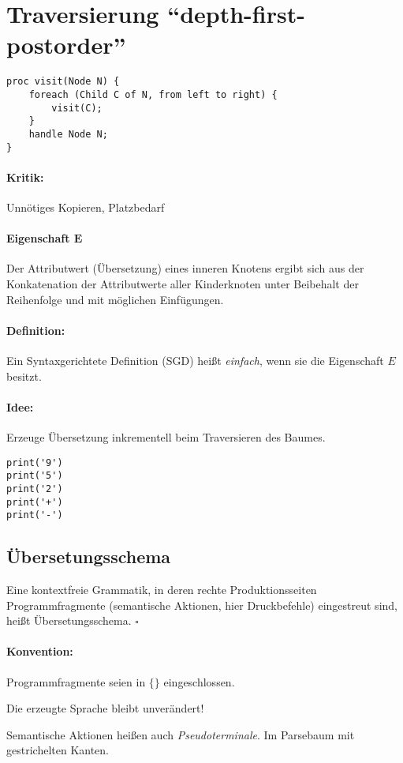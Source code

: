 \section{Traversierung "`depth-first-postorder"'}
\begin{lstlisting}
proc visit(Node N) {
	foreach (Child C of N, from left to right) {
		visit(C);
	}
	handle Node N;
}
\end{lstlisting}

\paragraph{Kritik:} Unnötiges Kopieren, Platzbedarf
\paragraph{Eigenschaft $\boldsymbol{E}$} Der Attributwert (Übersetzung) eines inneren Knotens ergibt sich aus der Konkatenation der Attributwerte aller Kinderknoten unter Beibehalt der Reihenfolge und mit möglichen Einfügungen.
\paragraph{Definition:} Ein Syntaxgerichtete Definition (SGD) heißt \emph{einfach}, wenn sie die Eigenschaft $E$ besitzt.
\paragraph{Idee:} Erzeuge Übersetzung inkrementell beim Traversieren des Baumes.
\begin{lstlisting}
print('9')
print('5')
print('2')
print('+')
print('-')
\end{lstlisting}
\subsection{Übersetungsschema}
Eine kontextfreie Grammatik, in deren rechte Produktionsseiten Programmfragmente (semantische Aktionen, hier Druckbefehle) eingestreut sind, heißt Übersetungsschema. \hfill$\square$
\paragraph{Konvention:} Programmfragmente seien in $\{\}$ eingeschlossen.

Die erzeugte Sprache bleibt unverändert!

Semantische Aktionen heißen auch \emph{Pseudoterminale}. Im Parsebaum mit gestrichelten Kanten.

